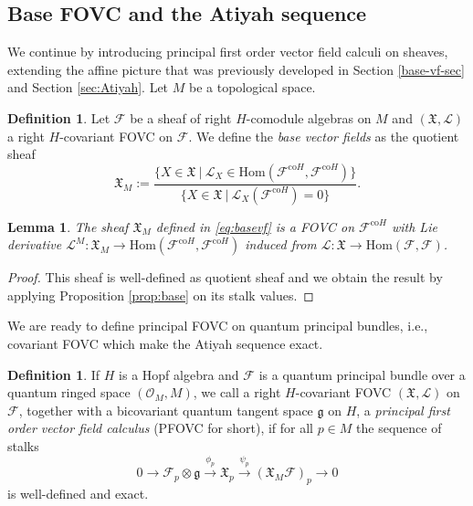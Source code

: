 \documentclass{article}
\newtheorem{lemma}[thm]{Lemma}
\theoremstyle{definition}
\newtheorem{definition}[thm]{Definition}
\begin{document}
\subsection{Base FOVC and the Atiyah sequence}\label{sec:sheafAtiyah}

{

We continue by introducing principal first order vector field calculi on sheaves, extending the affine picture that was previously developed in Section \ref{base-vf-sec} and Section \ref{sec:Atiyah}. 
Let $M$ be a topological space.

\begin{definition}
	Let $\mathcal{F}$ be a sheaf of right $H$-comodule algebras on $M$ and $(\mathfrak{X},\mathscr{L})$ a right $H$-covariant FOVC on $\mathcal{F}$. We define the \textit{base vector fields} as the quotient sheaf 
	\begin{equation}\label{eq:basevf}
		\mathfrak{X}_M
		:=\frac{\{X\in\mathfrak{X}~|~\mathscr{L}_X\in\mathrm{Hom}(\mathcal{F}^{\mathrm{co}H},\mathcal{F}^{\mathrm{co}H})\}}{\{X\in\mathfrak{X}~|~\mathscr{L}_X(\mathcal{F}^{\mathrm{co}H})=0\}}.
	\end{equation}
\end{definition}
\begin{lemma}
	The sheaf $\mathfrak{X}_M$ defined in \eqref{eq:basevf} is a FOVC on $\mathcal{F}^{\mathrm{co}H}$ with Lie derivative $\mathscr{L}^M\colon\mathfrak{X}_M\to\mathrm{Hom}(\mathcal{F}^{\mathrm{co}H},\mathcal{F}^{\mathrm{co}H})$ induced from $\mathscr{L}\colon\mathfrak{X}\to\mathrm{Hom}(\mathcal{F},\mathcal{F})$.
\end{lemma}
\begin{proof}
	This sheaf is well-defined as quotient sheaf and we obtain the result by applying Proposition \ref{prop:base} on its stalk values.
\end{proof}



We are ready to define principal FOVC on quantum principal bundles, i.e., covariant FOVC which make the Atiyah sequence exact.

\begin{definition}
	If $H$ is a Hopf algebra and $\mathcal{F}$ is a quantum principal bundle over a quantum ringed space $(\mathcal{O}_M,M)$, we call a right $H$-covariant FOVC $(\mathfrak{X},\mathscr{L})$ on $\mathcal{F}$, together with a bicovariant quantum tangent space $\mathfrak{g}$ on $H$, a \textit{principal first order vector field calculus} (PFOVC for short), if for all $p\in M$ the sequence of stalks
	\begin{equation}
		0\to\mathcal{F}_p\otimes\mathfrak{g}\xrightarrow{\phi_p}\mathfrak{X}_p\xrightarrow{\psi_p}(\mathfrak{X}_M\mathcal{F})_p\to 0
	\end{equation}
	is well-defined and exact.
\end{definition}

}
\end{document}
